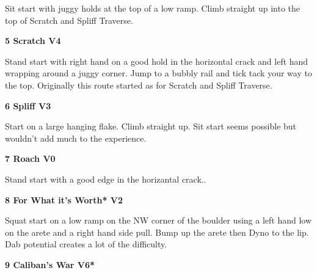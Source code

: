 \begin{multicols}{2}
\begin{adjustwidth}{0.5cm}{}
							\begin{adjustwidth}{0.5cm}{}				
							Sit start with juggy holds at the top of a low ramp. Climb straight up into the top of Scratch and Spliff Traverse.
							\end{adjustwidth}
						\end{adjustwidth}
					\label{rt:Scratch}
\colorbox{RoyalBlue!20}{
\parbox{0.95\linewidth}{
\textbf{
5 Scratch V4    
}
}
}

					\begin{adjustwidth}{0.5cm}{}				
					Stand start with right hand on a good hold in the horizontal crack and left hand wrapping around a juggy corner. Jump to a bubbly rail and tick tack your way to the top. Originally this route started as for Scratch and Spliff Traverse.
					\end{adjustwidth}

					\label{rt:Spliff}
\colorbox{green!20}{
\parbox{0.95\linewidth}{
\textbf{
6 Spliff V3     \warn 
}
}
}

					\begin{adjustwidth}{0.5cm}{}				
					Start on a large hanging flake. Climb straight up. Sit start seems possible but wouldn't add much to the experience.
					\end{adjustwidth}
					\label{rt:Roach}
\colorbox{green!20}{
\parbox{0.95\linewidth}{
\textbf{
7 Roach V0    
}
}
}

					\begin{adjustwidth}{0.5cm}{}				
					Stand start with a good edge in the horizantal crack..
					\end{adjustwidth}
					\label{rt:For What it's Worth}
\colorbox{green!20}{
\parbox{0.95\linewidth}{
\textbf{
8 For What it's Worth* V2    
}
}
}

					\begin{adjustwidth}{0.5cm}{}				
					Squat start on a low ramp on the NW corner of the boulder using a left hand low on the arete and a right hand side pull. Bump up the arete then Dyno to the lip. Dab potential creates a lot of the difficulty.
					\end{adjustwidth}

					\label{rt:Caliban's War}
\colorbox{RoyalBlue!20}{
\parbox{0.95\linewidth}{
\textbf{
9 Caliban's War V6*  
}
}
}


\end{multicols}
